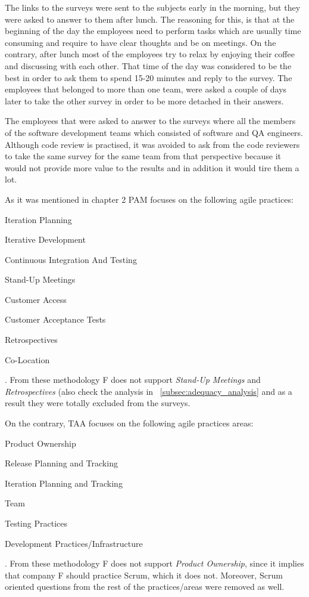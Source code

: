 The links to the surveys were sent to the subjects early in the morning, but they were asked to answer to them after lunch. The reasoning for this, is that at the beginning of the day the employees need to perform tasks which are usually time consuming and require to have clear thoughts and be on meetings. On the contrary, after lunch most of the employees try to relax by enjoying their coffee and discussing with each other. That time of the day was considered to be the best in order to ask them to spend 15-20 minutes and reply to the survey. The employees that belonged to more than one team, were asked a couple of days later to take the other survey in order to be more detached in their answers.

The employees that were asked to answer to the surveys where all the members of the software development teams which consisted of software and QA engineers. Although code review is practised, it was avoided to ask from the code reviewers to take the same survey for the same team from that perspective because it would not provide more value to the results and in addition it would tire them a lot.

As it was mentioned in chapter 2 PAM focuses on the following agile practices:
\begin{inparaenum} [a\upshape)]
	\item Iteration Planning
	\item Iterative Development
	\item Continuous Integration And Testing
	\item Stand-Up Meetings
	\item Customer Access
	\item Customer Acceptance Tests
	\item Retrospectives
	\item Co-Location
\end{inparaenum}
. From these methodology F does not support \textit{Stand-Up Meetings} and \textit{Retrospectives} (also check the analysis in ~\ref{subsec:adequacy_analysis} and as a result they were totally excluded from the surveys.

On the contrary, TAA focuses on the following agile practices areas:
\begin{inparaenum} [a\upshape)]
	\item Product Ownership
	\item Release Planning and Tracking
	\item Iteration Planning and Tracking
	\item Team
	\item Testing Practices
	\item Development Practices/Infrastructure
\end{inparaenum}
. From these methodology F does not support \textit{Product Ownership}, since it implies that company F should practice Scrum, which it does not. Moreover, Scrum oriented questions from the rest of the practices/areas were removed as well. 


